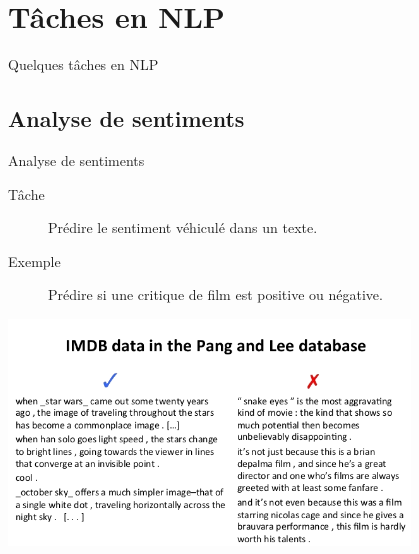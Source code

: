 \documentclass[french]{beamer}
\begin{document}

\section{Tâches en NLP}

\begin{frame}{}

\centering
{\Huge Quelques tâches en NLP}

\end{frame}


\subsection{Analyse de sentiments}

\begin{frame}{Analyse de sentiments}

\begin{description}
	\item [Tâche] Prédire le sentiment véhiculé dans un texte.
	\item [Exemple] Prédire si une critique de film est positive ou négative.
\end{description}

\centering
\includegraphics[height=6cm]{figures/sentiment_analysis_imdb.png}

\end{frame}
\end{document}
